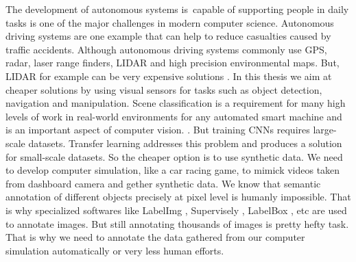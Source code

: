 The development of autonomous systems is capable of supporting people in daily tasks is one of the major challenges in modern computer science. Autonomous driving systems are one example that can help to reduce casualties caused by traffic accidents. Although autonomous driving systems commonly use GPS, radar, laser range finders, LIDAR and high precision environmental maps. But, LIDAR for example can be very expensive solutions \cite{verge_elon_lidar}. In this thesis we aim at cheaper solutions by using visual sensors for tasks such as object detection, navigation and manipulation. Scene classification is a requirement for many high levels of work in real-world environments for any automated smart machine and is an important aspect of computer vision.  \cite{Szegedy_2016_CVPR}. But training CNNs requires large-scale datasets. Transfer learning addresses this problem and produces a solution for small-scale datasets. So the cheaper option is to use synthetic data. We need to develop computer simulation, like a car racing game, to mimick videos taken from dashboard camera and gether synthetic data. We know that semantic annotation of different objects precisely at pixel level is humanly impossible. That is why specialized softwares like LabelImg \cite{LabelImg}, Supervisely \cite{supervise}, LabelBox \cite{labelbox}, etc are used to annotate images. But still annotating thousands of images is pretty hefty task. That is why we need to annotate the data gathered from our computer simulation automatically or very less human efforts.





